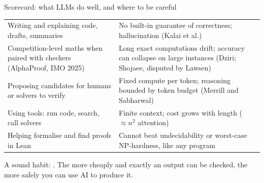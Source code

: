 \begin{frame}{Scorecard: what LLMs do well, and where to be careful}
\begin{sfig}[0.76]
\begin{tabular}{@{}L{66mm}L{66mm}@{}}
\toprule
{} & \\\midrule
Writing and explaining code, drafts, summaries & No built-in guarantee of correctness; hallucination (Kalai et al.)\\
Competition-level maths when paired with checkers (AlphaProof, IMO 2025) & Long exact computations drift; accuracy can collapse on large instances (Dziri; Shojaee, disputed by Lawsen)\\
Proposing candidates for humans or solvers to verify & Fixed compute per token; reasoning bounded by token budget (Merrill and Sabharwal)\\
Using tools: run code, search, call solvers & Finite context; cost grows with length ($\approx n^2$ attention)\\
Helping formalise and find proofs in Lean & Cannot beat undecidability or worst-case NP-hardness, like any program\\\bottomrule
\end{tabular}
\end{sfig}
\vspace{2mm}
{\small A sound habit: . The more cheaply and exactly an output can be checked, the more safely you can use AI to produce it.}
\end{frame}


